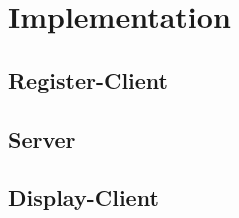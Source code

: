 \chapter{Implementation}

\section{Register-Client}
\label{sec:register_client}


\section{Server}
\label{sec:server}


\section{Display-Client}
\label{sec:display_client}
